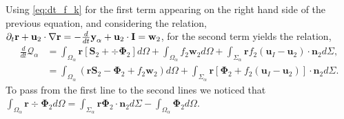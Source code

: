 Using \ref{eq:dt_f_k} for the first term appearing on the right hand side of the previous equation, and considering the relation,
$  \partial_t \textbf{r}
+ \textbf{u}_2 \cdot \mathbf{\nabla} \textbf{r}
= - \frac{d}{dt} \textbf{y}_\alpha  + \textbf{u}_2 \cdot \textbf{I}
= \textbf{w}_2$,
for the second term yields the relation,
\begin{align*}
    \frac{d}{dt} \mathcal{Q}_\alpha
    &= \int_{\Omega_\alpha} \textbf{r} \left[
         \textbf{S}_2 +  \div \mathbf{\Phi}_2
    \right]d\Omega
    +\int_{\Omega_\alpha} f_2  \textbf{w}_2 d\Omega
    + \int_{\Sigma_\alpha} \textbf{r}  f_2 (\textbf{u}_I-\textbf{u}_2)\cdot \textbf{n}_2  d\Sigma,\\
    &= \int_{\Omega_\alpha} \left( 
        \textbf{r} \textbf{S}_2 
        - \mathbf{\Phi}_2
        + f_2  \textbf{w}_2 
    \right) d\Omega
    + \int_{\Sigma_\alpha} \textbf{r} \left[
        \mathbf{\Phi}_2
        + f_2 (\textbf{u}_I-\textbf{u}_2)
    \right]\cdot \textbf{n}_2  d\Sigma.
\end{align*}
To pass from the first line to the second lines we noticed that $\int_{\Omega_\alpha} \textbf{r}  \div \mathbf{\Phi}_2 d\Omega
= \int_{\Sigma_\alpha} \textbf{r} \mathbf{\Phi}_2 \cdot \textbf{n}_2 d\Sigma
- \int_{\Omega_\alpha} \mathbf{\Phi}_2 d\Omega$. 





